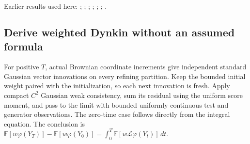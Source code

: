 \documentclass[11pt,a4paper]{report}
\begin{document}
Earlier results used here: \cite[Section~3.13.2]{LangevinLean2026ULASC}; \cite[Section~3.13.5]{LangevinLean2026ULASC}; \cite[Section~3.19.1]{LangevinLean2026ULASC}; \cite[Section~3.25.1]{LangevinLean2026ULASC}; \cite[Section~3.25.3]{LangevinLean2026ULASC}; \cite[Section~3.29.7]{LangevinLean2026ULASC}; \cite[Section~3.42.5]{LangevinLean2026ULASC}.
\subsection{\texorpdfstring{Derive weighted Dynkin without an assumed formula}{Derive weighted Dynkin without an assumed formula}}
\label{report-step-AverageLMC-LaplacianBrownianDynkin-lean-2}


For positive \(T\), actual Brownian coordinate increments give independent standard Gaussian vector innovations on every refining partition. Keep the bounded initial weight paired with the initialization, so each next innovation is fresh. Apply compact \(C^{2}\) Gaussian weak consistency, sum its residual using the uniform score moment, and pass to the limit with bounded uniformly continuous test and generator observations. The zero-time case follows directly from the integral equation. The conclusion is \(\mathbb E[w\varphi(Y_T)]-\mathbb E[w\varphi(Y_0)]=\int_0^T\mathbb E[w\mathcal L\varphi(Y_t)]\,dt\).
\end{document}
